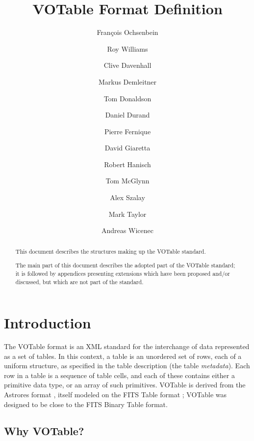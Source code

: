 \documentclass[11pt,a4paper]{ivoa}
\title{VOTable Format Definition}
\author[http://www.ivoa.net/twiki/bin/view/IVOA/FrancoisOchsenbein]
                                               {Fran\c{c}ois Ochsenbein}
\author[http://www.ivoa.net/twiki/bin/view/IVOA/RoyWilliams]{Roy Williams}
\author[http://www.ivoa.net/twiki/bin/view/IVOA/CliveDavenhall]{Clive Davenhall}
\author[http://www.ivoa.net/twiki/bin/view/IVOA/MarkusDemleitner]
                                               {Markus Demleitner}
\author[http://www.ivoa.net/twiki/bin/view/IVOA/TomDonaldson]{Tom Donaldson}
\author[http://www.ivoa.net/twiki/bin/view/IVOA/DanielDurand]{Daniel Durand}
\author[http://www.ivoa.net/twiki/bin/view/IVOA/PierreFernique]{Pierre Fernique}
\author[http://www.ivoa.net/twiki/bin/view/IVOA/DavidGiaretta]{David Giaretta}
\author[http://www.ivoa.net/twiki/bin/view/IVOA/BobHanisch]{Robert Hanisch}
\author[http://www.ivoa.net/twiki/bin/view/IVOA/TomMcGlynn]{Tom McGlynn}
\author[http://www.ivoa.net/twiki/bin/view/IVOA/AlexSzalay]{Alex Szalay}
\author[http://www.ivoa.net/twiki/bin/view/IVOA/MarkTaylor]{Mark Taylor}
\author[http://www.ivoa.net/twiki/bin/view/IVOA/AndreasWicenec]{Andreas Wicenec}
\begin{document}
\begin{abstract}
This document describes the structures making up
the VOTable standard.

The main part of this document describes the adopted part of the
VOTable standard; it is followed by appendices presenting extensions
which have been proposed and/or discussed, but which are not part of
the standard.
\end{abstract}


%
%
%


\section{Introduction}

The VOTable format is an XML standard for the interchange of data
represented as a set of tables.
In this context, a table is an unordered set of rows, each of
a uniform structure, as specified in the table description
(the table {\em metadata}).
Each row in a table is a sequence of table cells, and each of these contains
either a primitive data type, or an array of such primitives.
VOTable is derived from the
Astrores format \citep{astrores}, itself modeled on the FITS Table format
\citep{std:FITS};
VOTable was designed to be close to the FITS Binary Table format.

\subsection{Why VOTable?}
\end{document}
